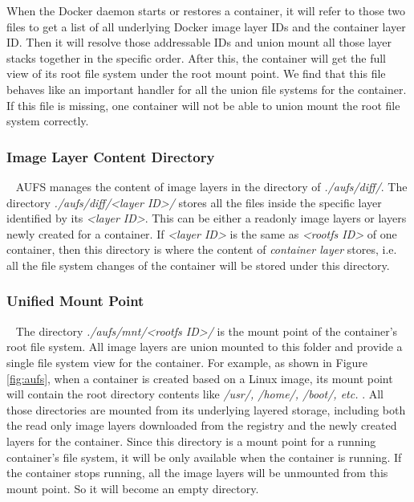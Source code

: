 
When the Docker daemon starts or restores a container, it will refer to those two files to get a list of all underlying Docker image layer IDs and the container layer ID. Then it will resolve those addressable IDs and union mount all those layer stacks together in the specific order. After this, the container will get the full view of its root file system under the root mount point. 
We find that this file behaves like an important handler for all the union file systems for the container. If this file is missing, one container will not be able to union mount the root file system correctly.


\smallbreak 
\subsubsection{Image Layer Content Directory}
~\smallbreak
AUFS manages the content of image layers in the directory of \textit{./aufs/diff/}. The directory
 \textit{./aufs/diff/<layer ID>/} stores all the files inside the specific layer identified by its \textit{<layer ID>}. This can be either a readonly image layers or layers newly created for a container. If \textit{<layer ID>} is the same as \textit{<rootfs ID>} of one container, then this directory is where the content of \textit{container layer} stores, i.e. all the file system changes of the container will be stored under this directory. 

\smallbreak 
\subsubsection{Unified Mount Point} 
~\smallbreak
The directory \textit{./aufs/mnt/<rootfs ID>/}  is the mount point of the container's root file system. All image layers are union mounted to this folder and provide a single file system view for the container. 
For example, as shown in Figure \ref{fig:aufs}, when a container is created based on a Linux image, its mount point will contain the root directory contents like \textit{/usr/, /home/, /boot/, etc. }.
All those directories are mounted from its underlying layered storage, including both the read only image layers downloaded from the registry and the newly created layers for the container. 
Since this directory is a mount point for a running container's file system, it will be only available when the container is running. If the container stops running, all the image layers will be unmounted from this mount point. So it will become an empty directory.

